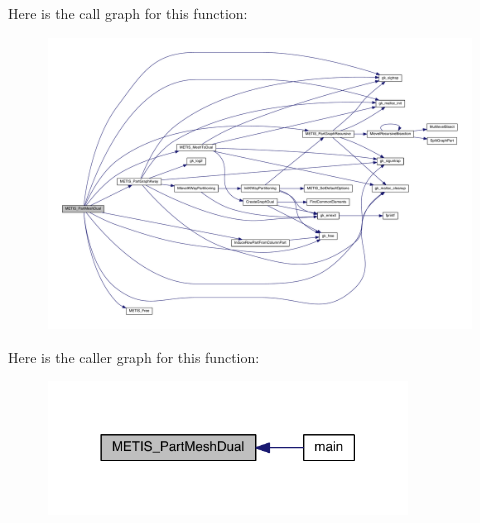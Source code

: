 Here is the call graph for this function\+:\nopagebreak
\begin{figure}[H]
\begin{center}
\leavevmode
\includegraphics[width=350pt]{a00236_a8f496ac1cd2246b124da246b5c6f9193_cgraph}
\end{center}
\end{figure}
Here is the caller graph for this function\+:\nopagebreak
\begin{figure}[H]
\begin{center}
\leavevmode
\includegraphics[width=270pt]{a00236_a8f496ac1cd2246b124da246b5c6f9193_icgraph}
\end{center}
\end{figure}
\mbox{\label{a00236_ade1e7e23ad687989a6343b4fb8d61ba7}} 
